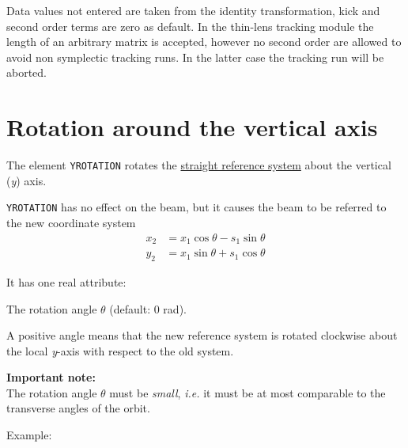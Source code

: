 Data values not entered are taken from the identity transformation, kick
and second order terms are zero as default. In the thin-lens tracking
module the length of an arbitrary matrix is accepted, however no second
order are allowed to avoid non symplectic tracking runs. In the latter
case the tracking run will be aborted.


\section{Rotation around the vertical axis}
\label{sec:yrotation}

The element \texttt{YROTATION} rotates the
\hyperref[subsec:local-straight]{straight reference system} about the
vertical (\textit{y}) axis.


\texttt{YROTATION} has no effect on the beam, but it
causes the beam to be referred to the new coordinate system  \\
\begin{equation}\begin{split}
x_2 &= x_1 \cos\theta - s_1 \sin\theta \\
y_2 &= x_1 \sin\theta + s_1 \cos\theta
\end{split}\end{equation}


It has one real attribute: 
\begin{madlist}
    The rotation angle $\theta$ (default: 0 rad).  
\end{madlist}

A positive angle means that the new reference system is rotated
clockwise about the local \textit{y}-axis with respect to the old system. 

\textbf{Important note:} \\
The rotation angle $\theta$ must be \emph{small}, \textsl{i.e.} it must be at
most comparable to the transverse angles of the orbit. 

Example: 

